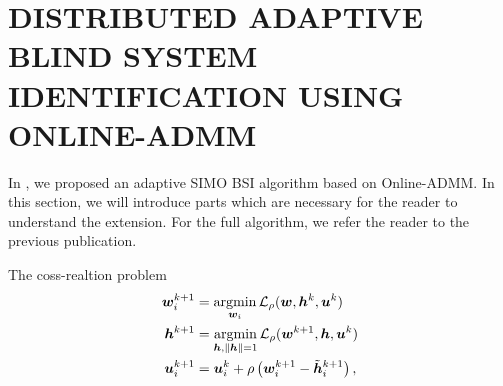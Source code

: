 \documentclass{article}
\begin{document}



\section{DISTRIBUTED ADAPTIVE BLIND SYSTEM IDENTIFICATION USING ONLINE-ADMM}
\label{sec:dbsi}
In \cite{blochbergerDBSI}, we proposed an adaptive SIMO BSI algorithm based on Online-ADMM.
In this section, we will introduce parts which are necessary for the reader to understand the extension.
For the full algorithm, we refer the reader to the previous publication.

The coss-realtion problem 
\begin{align}
  {\bm{w}}_i^{k+1} &= \underset{{\bm{w}}_i}{\operatorname{argmin}} \, \mathcal{L}_{\rho} ({\bm{w}},{\bm{h}}^k,{\bm{u}}^k)\label{eq:general_consensus_admm:local}\\
  {\bm{h}}^{k+1} &= \underset{{\bm{h}}, \|{\bm{h}}\| = 1}{\operatorname{argmin}}\, \mathcal{L}_{\rho} ({\bm{w}}^{k+1},{\bm{h}},{\bm{u}}^k)\label{eq:general_consensus_admm:global}\\
  {\bm{u}}_i^{k+1} &= {\bm{u}}_i^{k} + \rho \left( {\bm{w}}_i^{k+1} - \tilde{{\bm{h}}}_i^{k+1} \right),\label{eq:general_consensus_admm:dual}
\end{align}
\end{document}
